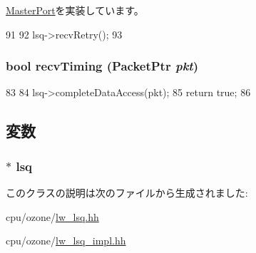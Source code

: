 \hyperlink{classMasterPort_ac1ccc3bcf7ebabb20b57fab99b2be5b0}{MasterPort}を実装しています。


\begin{DoxyCode}
91 {
92     lsq->recvRetry();
93 }
\end{DoxyCode}
\hypertarget{classOzoneLWLSQ_1_1DcachePort_aaeef0f6f81d00988bb7b8ba8fe56049e}{
\subsubsection[{recvTiming}]{\setlength{\rightskip}{0pt plus 5cm}bool recvTiming ({\bf PacketPtr} {\em pkt})}}
\label{classOzoneLWLSQ_1_1DcachePort_aaeef0f6f81d00988bb7b8ba8fe56049e}



\begin{DoxyCode}
83 {
84     lsq->completeDataAccess(pkt);
85     return true;
86 }
\end{DoxyCode}


\subsection{変数}
\hypertarget{classOzoneLWLSQ_1_1DcachePort_a792c595626894860987780b90079d2ee}{
\subsubsection[{lsq}]{$\ast$ {\bf lsq}}}
\label{classOzoneLWLSQ_1_1DcachePort_a792c595626894860987780b90079d2ee}


このクラスの説明は次のファイルから生成されました:\begin{DoxyCompactItemize}
\item 
cpu/ozone/\hyperlink{lw__lsq_8hh}{lw\_\-lsq.hh}\item 
cpu/ozone/\hyperlink{lw__lsq__impl_8hh}{lw\_\-lsq\_\-impl.hh}\end{DoxyCompactItemize}
